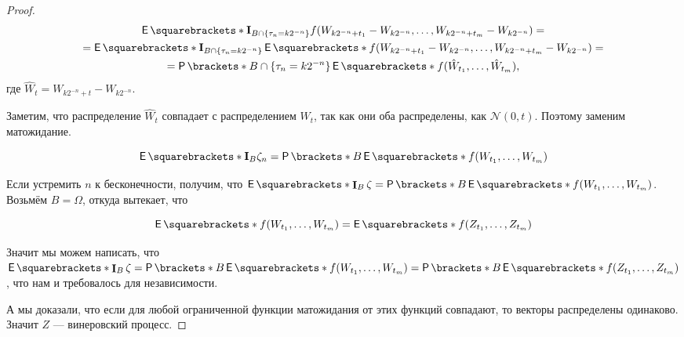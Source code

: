 \begin{proof}
  \begin{multline}
    \E{\mathbf{I}_{B\cap\{\tau_n = k2^{-n}\}}
    f(W_{k2^{-n} + t_1} - W_{k2^{-n}}, \ldots, W_{k2^{-n} + t_m} -
     W_{k2^{-n}})} =\\=\E{\mathbf{I}_{B\cap\{\tau_n = k2^{-n}\}}}\E{
    f(W_{k2^{-n} + t_1} - W_{k2^{-n}}, \ldots, W_{k2^{-n} + t_m} -
     W_{k2^{-n}})} =\\= 
     \Pr{B \cap \{\tau_n = k2^{-n}\}}\E{f(\hat{W}_{t_1}, \ldots, \hat{W}_{t_m})},
  \end{multline}
  где $\hat{W}_t = W_{k2^{-n} + t} - W_{k2^{-n}}$.

  Заметим, что распределение $\hat{W}_t$ совпадает с распределением $W_t$, так
  как они оба распределены, как $\mathcal{N}(0, t)$. Поэтому заменим матожидание.

  \[
    \E{\mathbf{I}_B\zeta_n} = \Pr{B}\E{f(W_{t_1}, \ldots, {W}_{t_m})}
  \]

  Если устремить $n$ к бесконечности, получим, что $\E{\I_B\zeta} = 
  \Pr{B}\E{f(W_{t_1}, \ldots, {W}_{t_m})}$. Возьмём $B = \Omega$, откуда вытекает,
  что

  \[
    \E{f(W_{t_1}, \ldots, {W}_{t_m})} = \E{f(Z_{t_1}, \ldots, Z_{t_m})}
  \]

  Значит мы можем написать, что $\E{\I_B\zeta} = 
  \Pr{B}\E{f(W_{t_1}, \ldots, {W}_{t_m})} = \Pr{B}\E{f(Z_{t_1}, \ldots, Z_{t_m})}$,
  что нам и требовалось для независимости.

  А мы доказали, что если для любой ограниченной функции матожидания от этих
  функций совпадают, то векторы распределены одинаково. Значит $Z$ --- винеровский
  процесс.
\end{proof}
